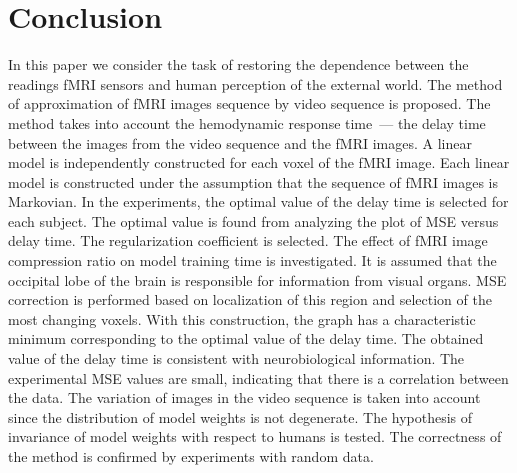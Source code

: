 \documentclass{article}
\begin{document}
\section{Conclusion}

In this paper we consider the task of restoring the dependence between the readings
fMRI sensors and human perception of the external world.
The method of approximation of fMRI images sequence by video sequence is proposed. 
The method takes into account the hemodynamic response time~--- the delay time between the images from the video sequence and the fMRI images. 
A linear model is independently constructed for each voxel of the fMRI image. 
Each linear model is constructed under the assumption that the sequence of fMRI images is Markovian. 
In the experiments, the optimal value of the delay time is selected for each subject. 
The optimal value is found from analyzing the plot of MSE versus delay time.
The regularization coefficient is selected. 
The effect of fMRI image compression ratio on model training time is investigated.
It is assumed that the occipital lobe of the brain is responsible for information from visual organs.
MSE correction is performed based on localization of this region and selection of the most changing voxels. 
With this construction, the graph has a characteristic minimum corresponding to the optimal value of the delay time.
The obtained value of the delay time is consistent with neurobiological information.
The experimental MSE values are small, indicating that there is a correlation between the data. 
The variation of images in the video sequence is taken into account since the distribution of model weights is not degenerate.
The hypothesis of invariance of model weights with respect to humans is tested. 
The correctness of the method is confirmed by experiments with random data.



\end{document}
